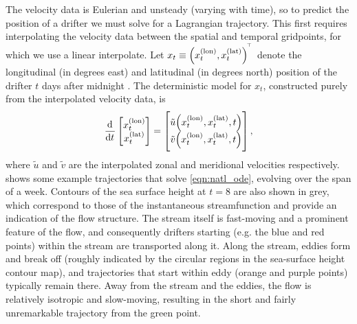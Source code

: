 The velocity data is Eulerian and unsteady (varying with time), so to predict the position of a drifter we must solve for a Lagrangian trajectory.
This first requires interpolating the velocity data between the spatial and temporal gridpoints, for which we use a linear interpolate.
Let \(x_t \equiv \left(x_t^{(\mathrm{lon})}, x_t^{(\mathrm{lat})}\right)^{^{\!\top}}\) denote the longitudinal (in degrees east) and latitudinal (in degrees north) position of the drifter \(t\) days after midnight .
The deterministic model for \(x_t\), constructed purely from the interpolated velocity data, is
\begin{equation}\label{eqn:natl_ode}
	\dod{}{t}\begin{bmatrix}
		x_t^{(\text{lon})} \\ x_t^{(\text{lat})}
	\end{bmatrix} = \begin{bmatrix}
		\tilde{u}\!\left(x^{(\mathrm{lon})}_t, x^{(\mathrm{lat})}_t, t\right) \\ \tilde{v}\!\left(x^{(\mathrm{lon})}_t, x^{(\mathrm{lat})}_t, t\right)
	\end{bmatrix},
\end{equation}
where \(\tilde{u}\) and \(\tilde{v}\) are the interpolated zonal and meridional velocities respectively.
 shows some example trajectories that solve \cref{eqn:natl_ode}, evolving over the span of a week.
Contours of the sea surface height at \(t = 8\) are also shown in grey, which correspond to those of the instantaneous streamfunction and provide an indication of the flow structure.
The stream itself is fast-moving and a prominent feature of the flow, and consequently drifters starting (e.g. the blue and red points) within the stream are transported along it.
Along the stream, eddies form and break off (roughly indicated by the circular regions in the sea-surface height contour map), and trajectories that start within eddy (orange and purple points) typically remain there.
Away from the stream and the eddies, the flow is relatively isotropic and slow-moving, resulting in the short and fairly unremarkable trajectory from the green point.


